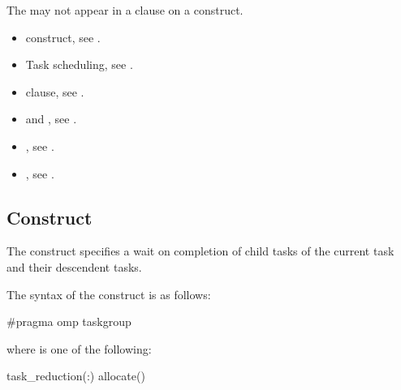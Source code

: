 \restrictions

The   may not appear in a
 clause on a  construct.

\crossreferences
\begin{itemize}
\item {} construct, see .

\item Task scheduling, see
.

\item {} clause, see .

\item {} and , see
.

\item {}, see
.

\item {}, see
.

\end{itemize}







\subsection{ Construct}
\label{subsec:taskgroup Construct}
\summary
The  construct specifies a wait on completion of child tasks of the current
task and their descendent tasks.

\syntax
\begin{ccppspecific}
The syntax of the  construct is as follows:

\begin{ompcPragma}
#pragma omp taskgroup  
\end{ompcPragma}

where  is one of the following:

\begin{indentedcodelist}
task_reduction(:)
allocate(\plc{[allocator: ]})
\end{indentedcodelist}
\end{ccppspecific}


